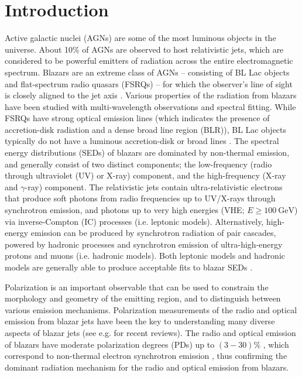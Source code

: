 \documentclass[twocolumn, tighten, twocolappendix]{aastex63}
\begin{document}
\section{Introduction} \label{sec:INTRO}
Active galactic nuclei (AGNs) are some of the most luminous objects in the universe. About 10\% of AGNs are observed to host relativistic jets, which are considered to be powerful emitters of radiation across the entire electromagnetic spectrum. Blazars are an extreme class of AGNs -- consisting of BL Lac objects and flat-spectrum radio quasars (FSRQs) -- for which the observer's line of sight is closely aligned to the jet axis \citep{Urry_Padovani_1995, Padovani_etal2018}. Various properties of the radiation from blazars have been studied with multi-wavelength observations and spectral fitting. While FSRQs have strong optical emission lines (which indicates the presence of accretion-disk radiation and a dense broad line region (BLR)), BL Lac objects typically do not have a luminous accretion-disk or broad lines \citep{Giommi_etal2012, Dermer_Giebels_2016}. The spectral energy distributions (SEDs) of blazars are dominated by non-thermal emission, and generally consist of two distinct components; the low-frequency (radio through ultraviolet (UV) or X-ray) component, and the high-frequency (X-ray and $\gamma$-ray) component. The relativistic jets contain ultra-relativistic electrons that produce soft photons from radio frequencies up to UV/X-rays through synchrotron emission, and photons up to very high energies (VHE; $E\geq 100~\mathrm{GeV}$) via inverse-Compton (IC) processes (i.e. leptonic models). Alternatively, high-energy emission can be produced by synchrotron radiation of pair cascades, powered by hadronic processes and synchrotron emission of ultra-high-energy protons and muons (i.e. hadronic models). Both leptonic models and hadronic models are generally able to produce acceptable fits to blazar SEDs \citep{Bottcher_etal2013}. 

Polarization is an important observable that can be used to constrain the morphology and geometry of the emitting region, and to distinguish between various emission mechanisms. Polarization measurements of the radio and optical emission from blazar jets have been the key to understanding many diverse aspects of blazar jets (see e.g. \cite{Bottcher_2019, Trippe_2019, Zhang_2019} for recent reviews). The radio and optical emission of blazars have moderate polarization degrees (PDs) up to $(3-30) \%$ \citep{Conway_etal1993, Zhang_etal2014}, which correspond to non-thermal electron synchrotron emission \citep{Westfold_1959, RybickiandLightman_1979}, thus confirming the dominant radiation mechanism for the radio and optical emission from blazars. 
\end{document}
